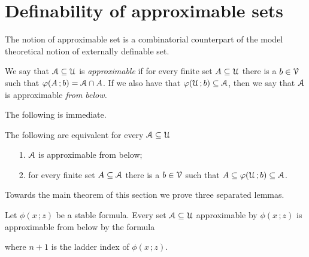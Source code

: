 \documentclass[scombinatorics.tex]{subfiles}
\begin{document}
\section{Definability of approximable sets}

The notion of approximable set is a combinatorial counterpart of the model theoretical notion of externally definable set.

\begin{definition}\label{def_approx}
  We say that $\EuScript A\subseteq\EuScript U$ is \emph{approximable\/} if for every finite set $A\subseteq\EuScript U$ there is a $b\in\EuScript V$ such that $\varphi(A\,;b)=\EuScript A\cap A$.
  If we also have that $\varphi(\EuScript U\,;b)\subseteq\EuScript A$, then we say that $\EuScript A$ is approximable \emph{from below.}\QED
\end{definition}

The following is immediate.

\begin{fact}
  The following are equivalent for every $\EuScript A\subseteq\EuScript U$
  \begin{itemize}
    \item[1.] $\EuScript A$ is approximable from below;
    \item[2.] for every finite set $A\subseteq\EuScript A$ there is a $b\in\EuScript V$ such that $A\subseteq\varphi(\EuScript U\,;b)\subseteq\EuScript A$.\QED
  \end{itemize}
\end{fact}

Towards the main theorem of this section we prove three separated lemmas.

\begin{lemma}
  Let $\phi(x\,;z)$ be a stable formula.
  Every set $\EuScript A\subseteq\EuScript U$ approximable by $\phi(x\,;z)$ is approximable from below by the formula

  
  where $n+1$ is the ladder index of $\phi(x\,;z)$.
\end{lemma}
\end{document}

